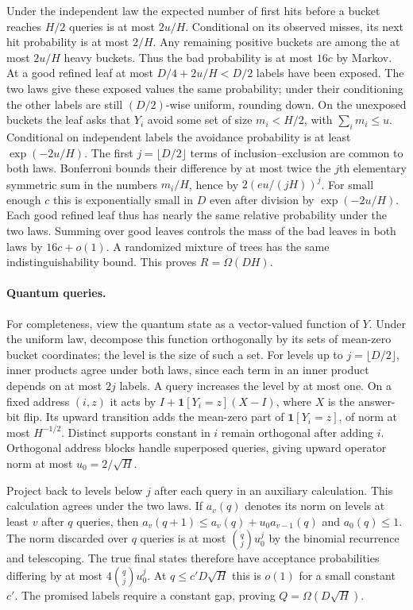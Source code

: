 \documentclass[11pt]{article}
\begin{document}
Under the independent law the expected number of first hits before a bucket reaches $H/2$ queries is at most $2u/H$. Conditional on its observed misses, its next hit probability is at most $2/H$. Any remaining positive buckets are among the at most $2u/H$ heavy buckets. Thus the bad probability is at most $16c$ by Markov. At a good refined leaf at most $D/4+2u/H<D/2$ labels have been exposed. The two laws give these exposed values the same probability; under their conditioning the other labels are still $(D/2)$-wise uniform, rounding down. On the unexposed buckets the leaf asks that $Y_i$ avoid some set of size $m_i<H/2$, with $\sum_i m_i\le u$. Conditional on independent labels the avoidance probability is at least $\exp(-2u/H)$. The first $j=\lfloor D/2\rfloor$ terms of inclusion--exclusion are common to both laws. Bonferroni bounds their difference by at most twice the $j$th elementary symmetric sum in the numbers $m_i/H$, hence by $2(eu/(jH))^j$. For small enough $c$ this is exponentially small in $D$ even after division by $\exp(-2u/H)$. Each good refined leaf thus has nearly the same relative probability under the two laws. Summing over good leaves controls the mass of the bad leaves in both laws by $16c+o(1)$. A randomized mixture of trees has the same indistinguishability bound. This proves $R=\Omega(DH)$.

\paragraph{Quantum queries.}
For completeness, view the quantum state as a vector-valued function of $Y$. Under the uniform law, decompose this function orthogonally by its sets of mean-zero bucket coordinates; the level is the size of such a set. For levels up to $j=\lfloor D/2\rfloor$, inner products agree under both laws, since each term in an inner product depends on at most $2j$ labels. A query increases the level by at most one. On a fixed address $(i,z)$ it acts by $I+\mathbf1[Y_i=z](X-I)$, where $X$ is the answer-bit flip. Its upward transition adds the mean-zero part of $\mathbf1[Y_i=z]$, of norm at most $H^{-1/2}$. Distinct supports constant in $i$ remain orthogonal after adding $i$. Orthogonal address blocks handle superposed queries, giving upward operator norm at most $u_0=2/\sqrt H$.

Project back to levels below $j$ after each query in an auxiliary calculation. This calculation agrees under the two laws. If $a_v(q)$ denotes its norm on levels at least $v$ after $q$ queries, then $a_v(q+1)\le a_v(q)+u_0a_{v-1}(q)$ and $a_0(q)\le1$. The norm discarded over $q$ queries is at most $\binom qj u_0^j$ by the binomial recurrence and telescoping. The true final states therefore have acceptance probabilities differing by at most $4\binom qj u_0^j$. At $q\le c' D\sqrt H$ this is $o(1)$ for a small constant $c'$. The promised labels require a constant gap, proving $Q=\Omega(D\sqrt H)$.
\end{document}
